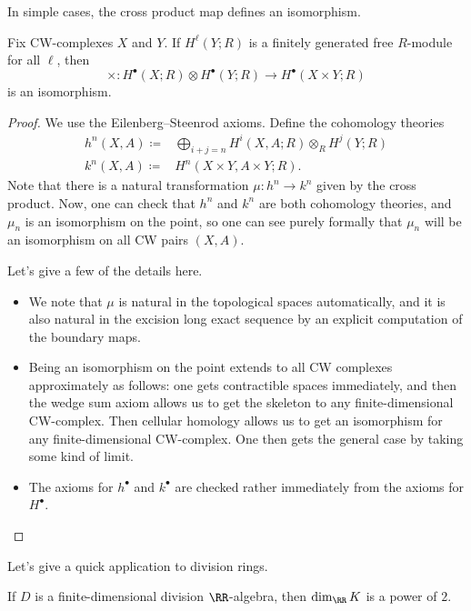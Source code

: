 \documentclass[../notes.tex]{subfiles}
\begin{document}
In simple cases, the cross product map defines an isomorphism.
\begin{theorem}
	Fix CW-complexes $X$ and $Y$. If $H^\ell(Y;R)$ is a finitely generated free $R$-module for all $\ell$, then
	\[\times\colon H^\bullet(X;R)\otimes H^\bullet(Y;R)\to H^\bullet(X\times Y;R)\]
	is an isomorphism.
\end{theorem}
\begin{proof}
	We use the Eilenberg--Steenrod axioms. Define the cohomology theories
	\begin{align*}
		h^n(X,A) \coloneqq{}& \bigoplus_{i+j=n}H^i(X,A;R)\otimes_R H^{j}(Y;R) \\
		k^n(X,A) \coloneqq{}& H^n(X\times Y,A\times Y;R).
	\end{align*}
	Note that there is a natural transformation $\mu\colon h^n\to k^n$ given by the cross product. Now, one can check that $h^n$ and $k^n$ are both cohomology theories, and $\mu_n$ is an isomorphism on the point, so one can see purely formally that $\mu_n$ will be an isomorphism on all CW pairs $(X,A)$.

	Let's give a few of the details here.
	\begin{itemize}
		\item We note that $\mu$ is natural in the topological spaces automatically, and it is also natural in the excision long exact sequence by an explicit computation of the boundary maps.
		\item Being an isomorphism on the point extends to all CW complexes approximately as follows: one gets contractible spaces immediately, and then the wedge sum axiom allows us to get the skeleton to any finite-dimensional CW-complex. Then cellular homology allows us to get an isomorphism for any finite-dimensional CW-complex. One then gets the general case by taking some kind of limit.
		\item The axioms for $h^\bullet$ and $k^\bullet$ are checked rather immediately from the axioms for $H^\bullet$.
		\qedhere
	\end{itemize}
\end{proof}
Let's give a quick application to division rings.
\begin{proposition}
	If $D$ is a finite-dimensional division $\RR$-algebra, then $\dim_\RR K$ is a power of $2$.
\end{proposition}
\end{document}
